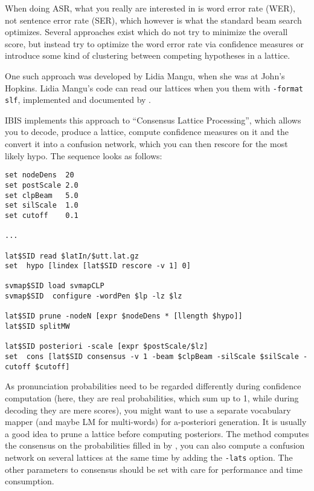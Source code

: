 When doing ASR, what you  really are interested  in is word error rate
(WER), not   sentence error  rate (SER), which   however  is what  the
standard beam search optimizes. Several approaches  exist which do not
try to  minimize the overall  score,  but instead try to  optimize the
word  error rate  via confidence  measures or  introduce  some kind of
clustering between competing hypotheses in a lattice.

One such approach was developed by Lidia Mangu, when she was at John's
Hopkins.  Lidia  Mangu's  code   can  read  our  lattices    when  you
 them   with {\tt   -format slf},   implemented  and
documented by .

IBIS  implements this  approach  to  ``Consensus Lattice Processing'',
which  allows you  to decode,  produce a   lattice, compute confidence
measures on it and the convert it  into a confusion network, which you
can  then  rescore for  the most likely   hypo. The  sequence looks as
follows:

\begin{verbatim}
set nodeDens  20
set postScale 2.0
set clpBeam   5.0
set silScale  1.0
set cutoff    0.1

...

lat$SID read $latIn/$utt.lat.gz
set  hypo [lindex [lat$SID rescore -v 1] 0]

svmap$SID load svmapCLP
svmap$SID  configure -wordPen $lp -lz $lz

lat$SID prune -nodeN [expr $nodeDens * [llength $hypo]]
lat$SID splitMW

lat$SID posteriori -scale [expr $postScale/$lz]
set  cons [lat$SID consensus -v 1 -beam $clpBeam -silScale $silScale -cutoff $cutoff]
\end{verbatim}

As pronunciation probabilities need to  be regarded differently during
confidence computation (here,  they are real probabilities,  which sum
up to  1, while during decoding they  are mere scores), you might want
to use a separate vocabulary mapper (and maybe LM for multi-words) for
a-posteriori generation. It is usually a good  idea to prune a lattice
before    computing  posteriors.   The    method
computes    the  consensus   on the     probabilities  filled  in   by
, you can also compute  a confusion network  on
several  lattices at  the  same time by   adding  the \texttt{-lats}
option. The other parameters to consensus should  be set with care for
performance and time consumption.

